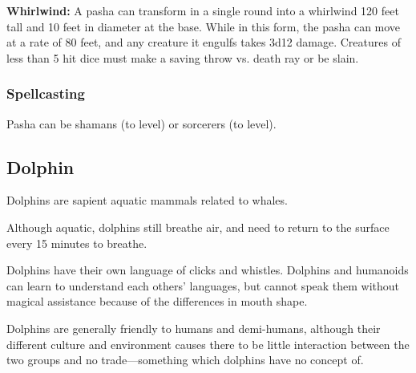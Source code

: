 \begin{multicols*}{2}
\textbf{Whirlwind:} A pasha can transform in a single round into a whirlwind 120 feet tall and 10 feet in diameter at the base. While in this form, the pasha can move at a rate of 80 feet, and any creature it engulfs takes 3d12 damage. Creatures of less than 5 hit dice must make a saving throw vs. death ray or be slain.

\subsubsection{Spellcasting}
Pasha can be shamans (to  level) or sorcerers (to  level).

\subsection{Dolphin}

Dolphins are sapient aquatic mammals related to whales.

Although aquatic, dolphins still breathe air, and need to return to the surface every 15 minutes to breathe.

Dolphins have their own language of clicks and whistles. Dolphins and humanoids can learn to understand each others’ languages, but cannot speak them without magical assistance because of the differences in mouth shape.

Dolphins are generally friendly to humans and demi-humans, although their different culture and environment causes there to be little interaction between the two groups and no trade—something which dolphins have no concept of.


\end{multicols*}
